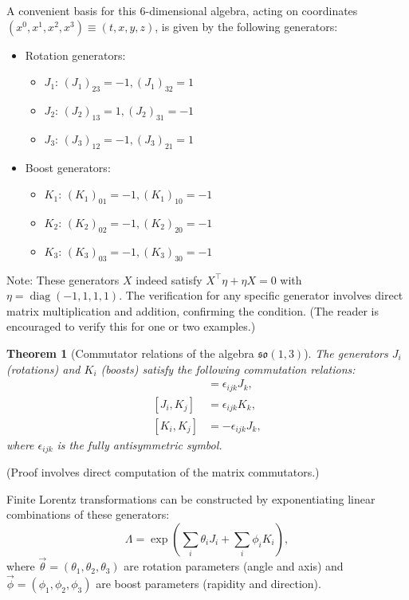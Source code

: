 \documentclass{amsart}
\newtheorem{theorem}{Theorem}[section]
\theoremstyle{definition}
\theoremstyle{remark}
\DeclareMathOperator{\diag}{diag}
\begin{document}
A convenient basis for this 6-dimensional algebra, acting on coordinates $(x^0, x^1, x^2, x^3) \equiv (t,x,y,z)$, is given by the following generators:
\begin{itemize}
    \item Rotation generators:
    \begin{itemize}
        \item $J_1$: $(J_1)_{23} = -1, (J_1)_{32} = 1$
        \item $J_2$: $(J_2)_{13} = 1, (J_2)_{31} = -1$
        \item $J_3$: $(J_3)_{12} = -1, (J_3)_{21} = 1$
    \end{itemize}
    \item Boost generators:
    \begin{itemize}
        \item $K_1$: $(K_1)_{01} = -1, (K_1)_{10} = -1$
        \item $K_2$: $(K_2)_{02} = -1, (K_2)_{20} = -1$
        \item $K_3$: $(K_3)_{03} = -1, (K_3)_{30} = -1$
    \end{itemize}
\end{itemize}
Note: These generators $X$ indeed satisfy $X^\top \eta + \eta X = 0$ with $\eta=\diag(-1,1,1,1)$.
The verification for any specific generator involves direct matrix multiplication and addition, confirming the condition.
(The reader is encouraged to verify this for one or two examples.)

\begin{theorem}[Commutator relations of the algebra $\mathfrak{so}(1,3)$]\label{thm:so13_algebra_commutation_relations}
  The generators $J_i$ (rotations) and $K_i$ (boosts) satisfy the following commutation relations:
  \begin{align*}
    [J_i, J_j] &= \epsilon_{ijk} J_k, \\
    [J_i, K_j] &= \epsilon_{ijk} K_k, \\
    [K_i, K_j] &= -\epsilon_{ijk} J_k,
  \end{align*}
  where $\epsilon_{ijk}$ is the fully antisymmetric symbol.
\end{theorem}
(Proof involves direct computation of the matrix commutators.)

Finite Lorentz transformations can be constructed by exponentiating linear combinations of these generators:
\begin{equation*}
  \Lambda = \exp\left(\sum_i \theta_i J_i + \sum_i \phi_i K_i \right),
\end{equation*}
where $\vec{\theta} = (\theta_1, \theta_2, \theta_3)$ are rotation parameters (angle and axis) and $\vec{\phi} = (\phi_1, \phi_2, \phi_3)$ are boost parameters (rapidity and direction).
\end{document}
